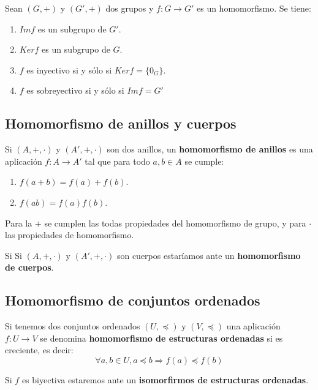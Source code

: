 Sean $(G,+)$ y $(G',+)$ dos grupos y $f: G \longrightarrow G'$ es un homomorfismo. Se tiene:
\begin{enumerate}
	\item $Im f$ es un subgrupo de $G'$.
	\item $Ker f$ es un subgrupo de $G$.
	\item $f$ es inyectivo si y sólo si $Ker f = \{0_G\}$.
	\item $f$ es sobreyectivo si y sólo si $Im f = G'$
\end{enumerate}

\subsection{Homomorfismo de anillos y cuerpos}

Si $(A,+,\cdot)$ y $(A',+,\cdot)$ son dos anillos, un \textbf{homomorfismo de anillos} es una aplicación $f: A \longrightarrow A'$ tal que para todo $a,b \in A$ se cumple:
\begin{enumerate}
	\item $f(a+b)=f(a)+f(b)$.
	\item $f(ab)=f(a)f(b)$.
\end{enumerate}

Para la $+$ se cumplen las todas propiedades del homomorfismo de grupo, y para $\cdot$ las propiedades de homomorfismo.

Si Si $(A,+,\cdot)$ y $(A',+,\cdot)$ son cuerpos estaríamos ante un \textbf{homomorfismo de cuerpos}.

\subsection{Homomorfismo de conjuntos ordenados}

Si tenemos dos conjuntos ordenados $(U,\preceq)$ y $(V,\preccurlyeq)$ una aplicación $f: U \longrightarrow V$ se denomina \textbf{homomorfismo de estructuras ordenadas} si es creciente, es decir:
\[
\forall a,b \in U, a \preceq b \Rightarrow f(a) \preceq f(b)
\]

Si $f$ es biyectiva estaremos ante un \textbf{isomorfirmos de estructuras ordenadas}.